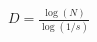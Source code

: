 \documentclass[preview]{standalone}
\begin{document}
\begin{align*}
D = \frac{\log(N)}{\log(1/s)}
\end{align*}
\end{document}
